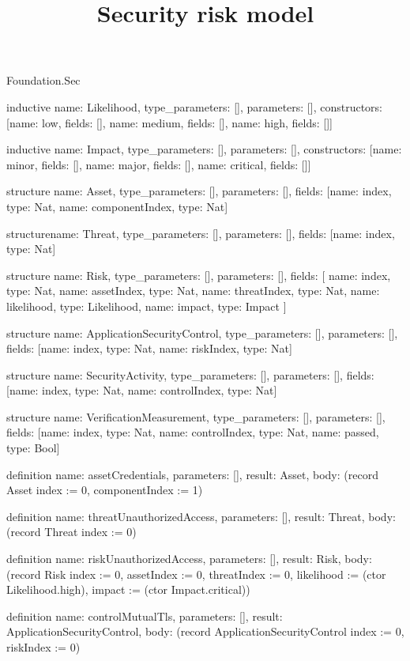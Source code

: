 \begin{lexlean}{Foundation.Sec}
\title{Security risk model}
\begin{semanticmodule}
inductive{
  name: Likelihood,
  type_parameters: [],
  parameters: [],
  constructors: [{name: low, fields: []}, {name: medium, fields: []}, {name: high, fields: []}]
}

inductive{
  name: Impact,
  type_parameters: [],
  parameters: [],
  constructors: [{name: minor, fields: []}, {name: major, fields: []}, {name: critical, fields: []}]
}

structure{
  name: Asset,
  type_parameters: [],
  parameters: [],
  fields: [{name: index, type: Nat}, {name: componentIndex, type: Nat}]
}

structure{name: Threat, type_parameters: [], parameters: [], fields: [{name: index, type: Nat}]}

structure{
  name: Risk,
  type_parameters: [],
  parameters: [],
  fields: [
    {name: index, type: Nat},
    {name: assetIndex, type: Nat},
    {name: threatIndex, type: Nat},
    {name: likelihood, type: Likelihood},
    {name: impact, type: Impact}
  ]
}

structure{
  name: ApplicationSecurityControl,
  type_parameters: [],
  parameters: [],
  fields: [{name: index, type: Nat}, {name: riskIndex, type: Nat}]
}

structure{
  name: SecurityActivity,
  type_parameters: [],
  parameters: [],
  fields: [{name: index, type: Nat}, {name: controlIndex, type: Nat}]
}

structure{
  name: VerificationMeasurement,
  type_parameters: [],
  parameters: [],
  fields: [{name: index, type: Nat}, {name: controlIndex, type: Nat}, {name: passed, type: Bool}]
}

definition{
  name: assetCredentials,
  parameters: [],
  result: Asset,
  body: (record Asset {index := 0, componentIndex := 1})
}

definition{
  name: threatUnauthorizedAccess,
  parameters: [],
  result: Threat,
  body: (record Threat {index := 0})
}

definition{
  name: riskUnauthorizedAccess,
  parameters: [],
  result: Risk,
  body: (record Risk {index := 0, assetIndex := 0, threatIndex := 0, likelihood := (ctor Likelihood.high), impact := (ctor Impact.critical)})
}

definition{
  name: controlMutualTls,
  parameters: [],
  result: ApplicationSecurityControl,
  body: (record ApplicationSecurityControl {index := 0, riskIndex := 0})
}


\end{semanticmodule}
\end{lexlean}
